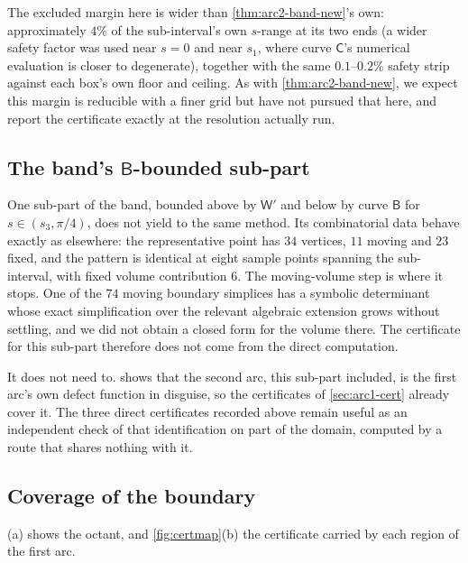 \documentclass[11pt,reqno]{amsart}
\renewcommand{\_}{\origunderscore\allowbreak}
\numberwithin{equation}{section}
\theoremstyle{plain}
\theoremstyle{definition}
\theoremstyle{remark}
\newcommand{\arcp}{s}                        %
\begin{document}
The excluded margin here is wider than \cref{thm:arc2-band-new}'s own:
approximately $4\%$ of the sub-interval's own $\arcp$-range at its two
ends (a wider safety factor was used near $\arcp=0$ and near
$\arcp_1$, where curve $\mathsf C$'s numerical evaluation is closer to
degenerate), together with the same $0.1$--$0.2\%$ safety strip against
each box's own floor and ceiling. As with \cref{thm:arc2-band-new}, we
expect this margin is reducible with a finer grid but have not pursued
that here, and report the certificate exactly at the resolution
actually run.

\subsection{The band's \texorpdfstring{$\mathsf B$}{B}-bounded sub-part}\label{sec:arc2-bandB-new}

One sub-part of the band, bounded above by $\mathsf W'$ and below by
curve $\mathsf B$ for $\arcp\in(\arcp_3,\pi/4)$, does not yield to the
same method. Its combinatorial data behave exactly as elsewhere: the
representative point has $34$ vertices, $11$ moving and $23$ fixed, and
the pattern is identical at eight sample points spanning the
sub-interval, with fixed volume contribution $6$. The moving-volume
step is where it stops. One of the $74$ moving boundary simplices has a
symbolic determinant whose exact simplification over the relevant
algebraic extension grows without settling, and we did not obtain a
closed form for the volume there. The certificate for this sub-part
therefore does not come from the direct computation.

It does not need to.  shows that the
second arc, this sub-part included, is the first arc's own defect
function in disguise, so the certificates of \cref{sec:arc1-cert}
already cover it. The three direct certificates recorded above remain
useful as an independent check of that identification on part of the
domain, computed by a route that shares nothing with it.

\subsection{Coverage of the boundary}\label{sec:arc2-coverage}

(a) shows the octant, and \cref{fig:certmap}(b) the
certificate carried by each region of the first arc.
\end{document}
